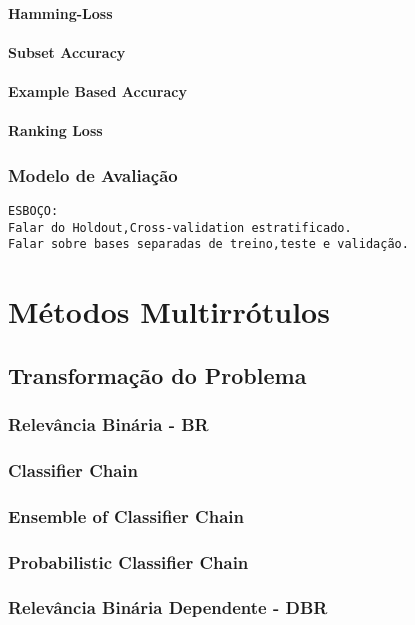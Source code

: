 \subsubsection{Hamming-Loss}
\subsubsection{Subset Accuracy}
\subsubsection{Example Based Accuracy}
\subsubsection{Ranking Loss}
\subsection{Modelo de Avaliação}
\label{sec:modelav}

\begin{verbatim}
ESBOÇO:
Falar do Holdout,Cross-validation estratificado.
Falar sobre bases separadas de treino,teste e validação.
\end{verbatim}

\chapter{Métodos Multirrótulos}
\section{Transformação do Problema}
\subsection{Relevância Binária - BR}
\label{sec:br}
\cite{br2010}
\subsection{Classifier Chain}
\cite{cc2009}
\subsection{Ensemble of Classifier Chain}
\subsection{Probabilistic Classifier Chain}
\subsection{Relevância Binária Dependente - DBR}
\label{sec:dbr}
